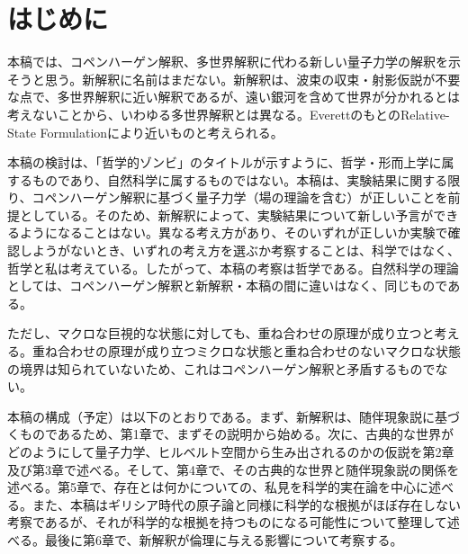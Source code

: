 \section*{はじめに}
本稿では、コペンハーゲン解釈、多世界解釈に代わる新しい量子力学の解釈を示そうと思う。新解釈に名前はまだない。新解釈は、波束の収束・射影仮説が不要な点で、多世界解釈に近い解釈であるが、遠い銀河を含めて世界が分かれるとは考えないことから、いわゆる多世界解釈とは異なる。EverettのもとのRelative-State Formulationにより近いものと考えられる。\par
本稿の検討は、「哲学的ゾンビ」のタイトルが示すように、哲学・形而上学に属するものであり、自然科学に属するものではない。本稿は、実験結果に関する限り、コペンハーゲン解釈に基づく量子力学（場の理論を含む）が正しいことを前提としている。そのため、新解釈によって、実験結果について新しい予言ができるようになることはない。異なる考え方があり、そのいずれが正しいか実験で確認しようがないとき、いずれの考え方を選ぶか考察することは、科学ではなく、哲学と私は考えている。したがって、本稿の考察は哲学である。自然科学の理論としては、コペンハーゲン解釈と新解釈・本稿の間に違いはなく、同じものである。\par
ただし、マクロな巨視的な状態に対しても、重ね合わせの原理が成り立つと考える。重ね合わせの原理が成り立つミクロな状態と重ね合わせのないマクロな状態の境界は知られていないため、これはコペンハーゲン解釈と矛盾するものでない。\par
本稿の構成（予定）は以下のとおりである。まず、新解釈は、随伴現象説に基づくものであるため、第1章で、まずその説明から始める。次に、古典的な世界がどのようにして量子力学、ヒルベルト空間から生み出されるのかの仮説を第2章及び第3章で述べる。そして、第4章で、その古典的な世界と随伴現象説の関係を述べる。第5章で、存在とは何かについての、私見を科学的実在論を中心に述べる。また、本稿はギリシア時代の原子論と同様に科学的な根拠がほぼ存在しない考察であるが、それが科学的な根拠を持つものになる可能性について整理して述べる。最後に第6章で、新解釈が倫理に与える影響について考察する。